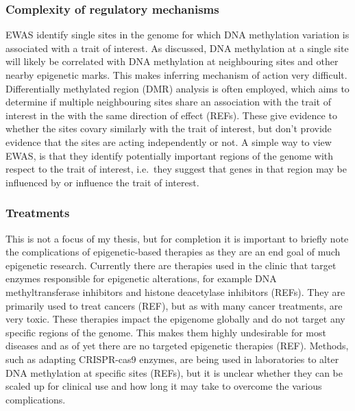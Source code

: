 \documentclass[11pt,twoside]{bristolthesis}
\begin{document}
\hypertarget{complexity-of-regulatory-mechanisms}{%
\subsubsection{Complexity of regulatory mechanisms}\label{complexity-of-regulatory-mechanisms}}

EWAS identify single sites in the genome for which DNA methylation variation is associated with a trait of interest. As discussed, DNA methylation at a single site will likely be correlated with DNA methylation at neighbouring sites and other nearby epigenetic marks. This makes inferring mechanism of action very difficult. Differentially methylated region (DMR) analysis is often employed, which aims to determine if multiple neighbouring sites share an association with the trait of interest in the with the same direction of effect (REFs). These give evidence to whether the sites covary similarly with the trait of interest, but don't provide evidence that the sites are acting independently or not. A simple way to view EWAS, is that they identify potentially important regions of the genome with respect to the trait of interest, i.e.~they suggest that genes in that region may be influenced by or influence the trait of interest.

\hypertarget{treatments}{%
\subsubsection{Treatments}\label{treatments}}

This is not a focus of my thesis, but for completion it is important to briefly note the complications of epigenetic-based therapies as they are an end goal of much epigenetic research. Currently there are therapies used in the clinic that target enzymes responsible for epigenetic alterations, for example DNA methyltransferase inhibitors and histone deacetylase inhibitors (REFs). They are primarily used to treat cancers (REF), but as with many cancer treatments, are very toxic. These therapies impact the epigenome globally and do not target any specific regions of the genome. This makes them highly undesirable for most diseases and as of yet there are no targeted epigenetic therapies (REF). Methods, such as adapting CRISPR-cas9 enzymes, are being used in laboratories to alter DNA methylation at specific sites (REFs), but it is unclear whether they can be scaled up for clinical use and how long it may take to overcome the various complications.
\end{document}

